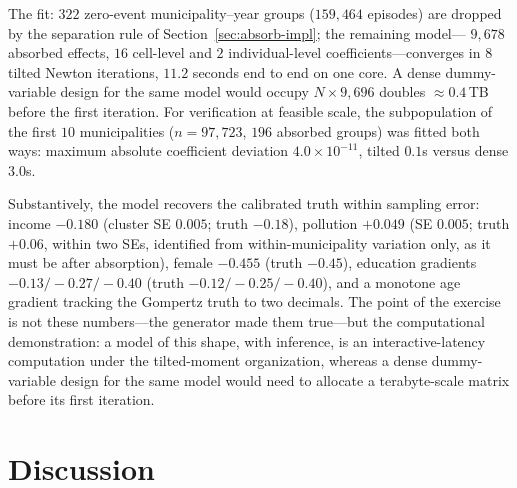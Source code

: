 \documentclass[11pt]{article}
\begin{document}
The fit: $322$ zero-event municipality--year groups ($159{,}464$
episodes) are dropped by the separation rule of Section~\ref{sec:absorb-impl}; the remaining model---%
$9{,}678$ absorbed effects, $16$ cell-level and $2$ individual-level
coefficients---converges in $8$ tilted Newton iterations,
$11.2$ seconds end to end on one core.  A dense dummy-variable design for
the same model would occupy $N \times 9{,}696$ doubles $\approx 0.4$\,TB
before the first iteration.  For verification at feasible scale, the
subpopulation of the first $10$ municipalities ($n = 97{,}723$, $196$
absorbed groups) was fitted both ways: maximum absolute coefficient
deviation $4.0 \times 10^{-11}$, tilted $0.1$s versus dense $3.0$s.

Substantively, the model recovers the calibrated truth within sampling
error: income $-0.180$ (cluster SE $0.005$; truth $-0.18$), pollution
$+0.049$ (SE $0.005$; truth $+0.06$, within two SEs, identified from
within-municipality variation only, as it must be after absorption),
female $-0.455$ (truth $-0.45$), education gradients $-0.13/-0.27/-0.40$
(truth $-0.12/-0.25/-0.40$), and a monotone age gradient tracking the
Gompertz truth to two decimals.  The point of the exercise is not these
numbers---the generator made them true---but the computational
demonstration: a model of this shape, with inference, is an
interactive-latency computation under the tilted-moment organization,
whereas a dense dummy-variable design for the same model would need to
allocate a terabyte-scale matrix before its first iteration.


\section{Discussion}\label{sec:discussion}
\end{document}
